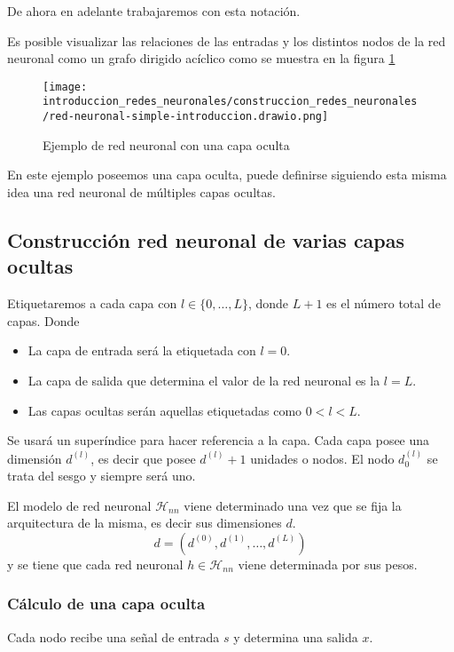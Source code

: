 De ahora en adelante trabajaremos con esta notación. 

Es posible visualizar las relaciones de las entradas y los distintos nodos de la 
red neuronal como un grafo dirigido acíclico como se muestra en la figura \ref{img:ejemplo topología red neuronal}

\begin{figure}[h!] 
    \centering
    \texttt{[image: introduccion\_redes\_neuronales/construccion\_redes\_neuronales/red-neuronal-simple-introduccion.drawio.png]}
    \caption{Ejemplo de red neuronal con una capa oculta}
    \label{img:ejemplo topología red neuronal}
\end{figure} 
 

En este ejemplo poseemos una capa oculta, 
puede definirse siguiendo esta misma idea
una red neuronal de múltiples capas ocultas. 

\subsection{Construcción red neuronal de varias capas ocultas} \label{rrnn:construcción_generalizada}

Etiquetaremos a cada capa con $l \in \{0, \ldots, L \}$, donde $L+1$ es el número total de capas.  Donde 

\begin{itemize}
    \item La capa de entrada será la etiquetada con $l = 0$.
    \item La capa de salida que determina el valor de la red neuronal es la $l=L$.
    \item Las capas ocultas serán aquellas etiquetadas como $0 < l <L.$
\end{itemize}

Se usará un superíndice para hacer referencia a la capa. 
Cada capa posee una dimensión $d^{(l)}$, es decir que posee
$d^{(l)} + 1$ unidades o nodos. El nodo $d_0^{(l)}$ se trata del sesgo y siempre será uno. 

El modelo de red neuronal $\mathcal{H}_{n n}$ viene determinado una vez que se fija la arquitectura de la misma, es decir sus dimensiones $d$. 
\begin{equation}
    d = (d^{(0)}, d^{(1)}, \ldots, d^{(L)})
\end{equation}
y se tiene que cada red neuronal $h \in \mathcal{H}_{n n}$
viene determinada por sus pesos. 

\subsubsection*{Cálculo de una capa oculta}  
Cada nodo recibe una señal de entrada $s$ y determina una salida $x$. 
  
